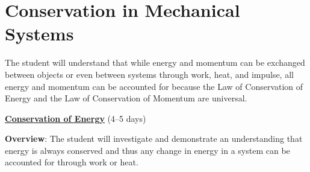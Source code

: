 \documentclass[dvipsnames]{article}
\begin{document}
\section{Conservation in Mechanical Systems}

\vspace{-3pt}
The student will understand that while energy and momentum can be exchanged between objects or even between systems through work, heat, and impulse, all energy and momentum can be accounted for because the Law of Conservation of Energy and the Law of Conservation of Momentum are universal.
\vspace{3pt}

\textbf{\underline{Conservation of Energy}} (4--5 days)

\textbf{Overview}: The student will investigate and demonstrate an understanding that energy is always conserved and thus any change in energy in a system can be accounted for through work or heat. 
\end{document}
